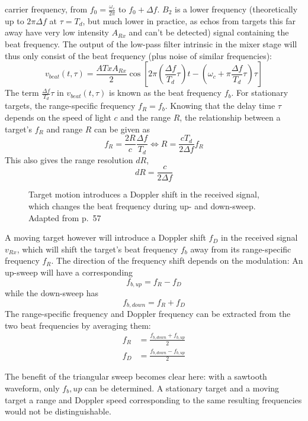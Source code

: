 carrier frequency, from \(f_0 = \frac{\omega_c}{2\pi}\) to
\(f_0 + \Delta f\). \(B_2\) is a lower frequency (theoretically up to
\(2\pi\Delta f\) at \(\tau = T_d\), but much lower in practice, as echos
from targets this far away have very low intensity \(A_{Rx}\) and can't
be detected) signal containing the beat frequency. The output of the
low-pass filter intrinsic in the mixer stage will thus only consist of
the beat frequency (plus noise of similar frequencies): \[
v_{beat}(t,\tau) = \frac{A{Tx}A_{Rx}}{2} \cos \left[ 2\pi\left(\frac{\Delta f}{T_d}\tau\right)t - \left(\omega_c + \pi\frac{\Delta f}{T_d}\tau \right) \tau \right]
\] The term \(\frac{\Delta f}{T_d}\tau\) in \(v_{beat}(t,\tau)\) is
known as the beat frequency \(f_b\). For stationary targets, the
range-specific frequency \(f_R = f_b\). Knowing that the delay time
\(\tau\) depends on the speed of light \(c\) and the range \(R\), the
relationship between a target's \(f_R\) and range \(R\) can be given as
\[
f_R = \frac{2R}{c} \frac{\Delta f}{T_d} \iff R=\frac{c T_d}{2\Delta f}f_R
\] This also gives the range resolution \(dR\), \[
dR = \frac{c}{2 \Delta f}
\]

\begin{figure}[htp]
    \centering
    \label{fig:fmcw_doppler}
    \def\svgwidth{\linewidth}
    
    \caption{Target motion introduces a Doppler shift in the received signal, which changes the beat frequency during up- and down-sweep. Adapted from \cite{Adams2012} p.~57}
\end{figure}

A moving target however will introduce a Doppler shift \(f_D\) in the
received signal \(v_{Rx}\), which will shift the target's beat frequency
\(f_b\) away from its range-specific frequency \(f_R\). The direction of
the frequency shift depends on the modulation: An up-sweep will have a
corresponding \[f_{b,up} = f_R - f_D\] while the down-sweep has
\[f_{b,down} = f_R + f_D\] The range-specific frequency and Doppler
frequency can be extracted from the two beat frequencies by averaging
them: \[
\begin{aligned}
f_R &= \frac{f_{b,down} + f_{b,up}}{2} \\
f_D &= \frac{f_{b,down} - f_{b,up}}{2}
\end{aligned}
\]

The benefit of the triangular sweep becomes clear here: with a sawtooth
waveform, only \(f_b,up\) can be determined. A stationary target and a
moving target a range and Doppler speed corresponding to the same
resulting frequencies would not be distinguishable.


